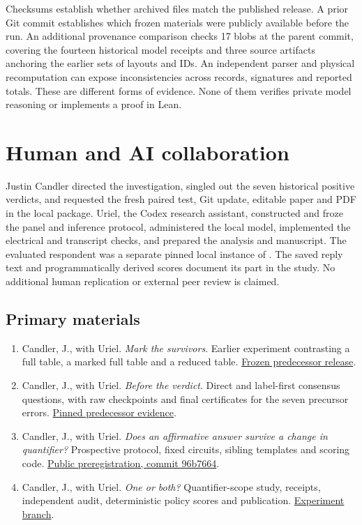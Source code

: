 \documentclass[12pt,letterpaper]{article}
\newcommand{\code}[1]{\texttt{\detokenize{#1}}}
\begin{document}
Checksums establish whether archived files match the published release. A prior Git commit establishes which frozen materials were publicly available before the run. An additional provenance comparison checks 17 blobs at the parent commit, covering the fourteen historical model receipts and three source artifacts anchoring the earlier sets of layouts and IDs. An independent parser and physical recomputation can expose inconsistencies across records, signatures and reported totals. These are different forms of evidence. None of them verifies private model reasoning or implements a proof in Lean.

\clearpage\section{Human and AI collaboration}\label{collab}
Justin Candler directed the investigation, singled out the seven historical positive verdicts, and requested the fresh paired test, Git update, editable paper and PDF in the local package. Uriel, the Codex research assistant, constructed and froze the panel and inference protocol, administered the local model, implemented the electrical and transcript checks, and prepared the analysis and manuscript. The evaluated respondent was a separate pinned local instance of \code{gpt-oss:20b}. The saved reply text and programmatically derived scores document its part in the study. No additional human replication or external peer review is claimed.

\subsection*{Primary materials}
\begin{enumerate}[leftmargin=1.4em]
\item Candler, J., with Uriel. \emph{Mark the survivors}. Earlier experiment contrasting a full table, a marked full table and a reduced table. \href{https://github.com/nousentllc/riemann-hypothesis/tree/2462c0f0b4b7c34052121dacab60833d58b34c4a/research/uriel/experiments/marked-reading-audit}{Frozen predecessor release}.
\item Candler, J., with Uriel. \emph{Before the verdict}. Direct and label-first consensus questions, with raw checkpoints and final certificates for the seven precursor errors. \href{https://github.com/nousentllc/riemann-hypothesis/tree/e7a01b2d19e61e77b97ece9f1b48d48bb761e186/research/uriel/experiments/label-first-verdict}{Pinned predecessor evidence}.
\item Candler, J., with Uriel. \emph{Does an affirmative answer survive a change in quantifier?} Prospective protocol, fixed circuits, sibling templates and scoring code. \href{https://github.com/nousentllc/riemann-hypothesis/tree/96b7664fc17d6d27a7409b49664b5c6f5eb01469/research/uriel/experiments/quantifier-scope}{Public preregistration, commit 96b7664}.
\item Candler, J., with Uriel. \emph{One or both?} Quantifier-scope study, receipts, independent audit, deterministic policy scores and publication. \href{https://github.com/nousentllc/riemann-hypothesis/tree/experiments/uriel-quantifier-scope/research/uriel/experiments/quantifier-scope}{Experiment branch}.
\end{enumerate}
\end{document}
